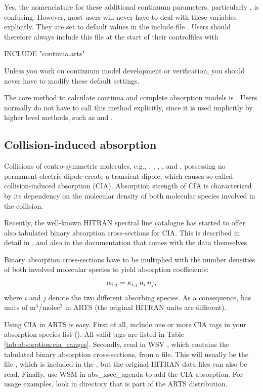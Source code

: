 Yes, the nomenclature for these additional continuum parameters,
particularly , is confusing. However,
most users will never have to deal with these variables
explicitly. They are set to default values in the include file
. Users should therefore always include this file  at
the start of their controlfiles with
\begin{code}
  INCLUDE "continua.arts"
\end{code}
Unless you work on continuum model development or verification, you
should never have to modify these default settings.

The core method to calculate continua and complete absorption models
is .  Users normally do not
have to call this method explicitly, since it is used implicitly by
higher level methods, such as  and
.

\subsection{Collision-induced absorption}
\label{sec:absorption:cia}

Collisions of centro-symmetric molecules, e.g., ,
, , , and , possessing no permanent
electric dipole create a transient dipole, which causes so-called collision-induced
absorption (CIA). Absorption strength of CIA is characterized by its dependency
on the molecular density of both molecular species involved in the collision.

Recently, the well-known HITRAN spectral line catalogue has started to
offer also tabulated binary absorption cross-sections for CIA.  This is
described in detail in \citet{richard:12}, and also in the documentation that
comes with the data themselves.

Binary absorption cross-sections
 have to be multiplied with the number densities of both involved
molecular species to yield absorption coefficients:
\begin{equation}
{\alpha}_{i,j} =  {\kappa}_{i,j} \, {n}_{i} \, {n}_{j},
\end{equation}
where $i$ and $j$ denote the two different absorbing species. As a
consequence,  has units of m$^5$/molec$^2$ in ARTS (the
original HITRAN units are different).

Using CIA in ARTS is easy. First of all, include one or more CIA tags
in your absorption species list (). All valid
tags are listed in Table \ref{tab:absorption:cia_ranges}. Secondly,
read in WSV , which contains the tabulated
binary absorption cross-sections, from a file. This will usually be the
file , which is included in the
, but the original HITRAN data files can also be
read. Finally, use WSM  in
abs\_xsec\_agenda to add the CIA absorption. For usage examples, look
in directory  that is part
of the ARTS distribution.

